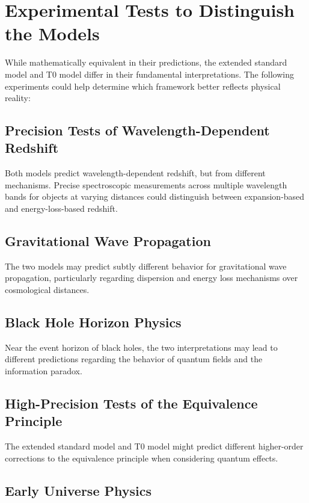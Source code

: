 \documentclass[12pt,a4paper]{article}
\begin{document}
	\section{Experimental Tests to Distinguish the Models}
	
	While mathematically equivalent in their predictions, the extended standard model and T0 model differ in their fundamental interpretations. The following experiments could help determine which framework better reflects physical reality:
	
	\subsection{Precision Tests of Wavelength-Dependent Redshift}
	
	Both models predict wavelength-dependent redshift, but from different mechanisms. Precise spectroscopic measurements across multiple wavelength bands for objects at varying distances could distinguish between expansion-based and energy-loss-based redshift.
	
	\subsection{Gravitational Wave Propagation}
	
	The two models may predict subtly different behavior for gravitational wave propagation, particularly regarding dispersion and energy loss mechanisms over cosmological distances.
	
	\subsection{Black Hole Horizon Physics}
	
	Near the event horizon of black holes, the two interpretations may lead to different predictions regarding the behavior of quantum fields and the information paradox.
	
	\subsection{High-Precision Tests of the Equivalence Principle}
	
	The extended standard model and T0 model might predict different higher-order corrections to the equivalence principle when considering quantum effects.
	
	\subsection{Early Universe Physics}
	
\end{document}
